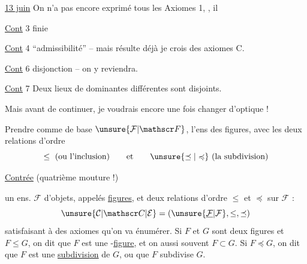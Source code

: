 
\uline{13 juin} On n'a pas encore exprimé tous les Axiomes \uline{} 1, , il  

\uline{Cont} 3  finie

\uline{Cont} 4 ``admissibilité'' -- mais résulte déjà je crois des axiomes C.

\uline{Cont} 6  disjonction  -- on y reviendra.

\uline{Cont} 7 Deux lieux de  dominantes différentes sont disjoints.

Mais avant de continuer, je voudrais encore une fois changer d'optique !

Prendre comme  de base $\unsure{\mathcal F|\mathscr F}$, l'ens des figures, avec les deux relations d'ordre \[ \leq\ \text{(ou l'inclusion)} \qquad \text{et}\qquad \unsure{\preceq|\preccurlyeq}\ \text{(la subdivision)} \]

\uline{Contrée} (quatrième mouture !)

 un ens. $\mathcal F$ d'objets, appelés \uline{figures}, et deux relations d'ordre $\leq$ et $\preceq$ sur $\mathcal F$ : \[ \unsure{\mathcal C|\mathscr C|\mathcal E}=(\unsure{\underline{\mathcal F}|\mathcal F},\leq,\preceq) \] satisfaisant à des axiomes\unsure{,|{}} qu'on va énumérer. Si $F$ et $G$ sont deux figures et $F\leq G$, on dit que $F$ est une -\uline{figure}, et on  aussi souvent $F\subset G$. Si $F\preceq G$, on dit que $F$ est une \uline{subdivision} de $G$, ou que $F$ subdivise $G$.
